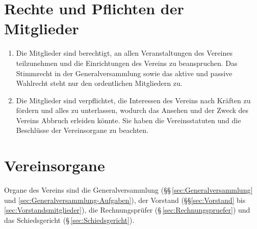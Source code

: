 \documentclass[a4paper,12pt]{article}
\begin{document}
\section{Rechte und Pflichten der Mitglieder} %
\label{sec:Rechte-Pflichten}
\begin{enumerate}

\item\label{item:rp-rechte} Die Mitglieder sind berechtigt, an allen Veranstaltungen des Vereines teilzunehmen und die Einrichtungen des Vereins zu beanspruchen. Das Stimmrecht in der Generalversammlung sowie das aktive und passive Wahlrecht steht nur den ordentlichen Mitgliedern zu.
\item\label{item:rp-pflichten} Die Mitglieder sind verpflichtet, die Interessen des Vereins nach Kräften zu fördern und alles zu unterlassen, wodurch das Ansehen und der Zweck des Vereins Abbruch erleiden könnte. Sie haben die Vereinsstatuten und die Beschlüsse der Vereinsorgane zu beachten.
\end{enumerate}


\section{Vereinsorgane} %
\label{sec:Vereinsorgane}
Organe des Vereins sind die Generalversammlung
(§§\,\ref{sec:Generalversammlung} und
\ref{sec:Generalversammlung-Aufgaben}), der Vorstand
(§§\ref{sec:Vorstand} bis \ref{sec:Vorstandsmitglieder}), die
Rechnungsprüfer (§\,\ref{sec:Rechnungspruefer}) und das Schiedsgericht
(§\,\ref{sec:Schiedsgericht}).
\end{document}
